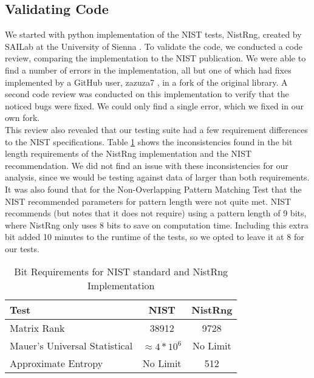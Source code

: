 \documentclass[11pt,letterpaper,conference]{IEEEtran}
\begin{document}
\subsection{Validating Code}
We started with python implementation of the NIST tests, NistRng, created by SAILab at the University of Sienna \cite{SAILab}. To validate the code, we conducted a code review, comparing the implementation to the NIST publication. We were able to find a number of errors in the implementation, all but one of which had fixes implemented by a GitHub user, zazuza7 \cite{zazuza7}, in a fork of the original library. A second code review was conducted on this implementation to verify that the noticed bugs were fixed. We could only find a single error, which we fixed in our own fork.\\

This review also revealed that our testing suite had a few requirement differences to the NIST specifications. Table \ref{table:Bits} shows the inconsistencies found in the bit length requirements of the NistRng implementation and the NIST recommendation. We did not find an issue with these inconsistencies for our analysis, since we would be testing against data of larger than both requirements. It was also found that for the Non-Overlapping Pattern Matching Test that the NIST recommended parameters for pattern length were not quite met. NIST recommends (but notes that it does not require) using a pattern length of 9 bits, where NistRng only uses 8 bits to save on computation time. Including this extra bit added 10 minutes to the runtime of the tests, so we opted to leave it at 8 for our tests.

\begin{table}
\begin{tabular}{|l||c|c|}
\hline
Test & NIST & NistRng \\
\hline
Matrix Rank  & 38912 &  9728\\
Mauer's Universal Statistical & $\approx 4*10^6$ & No Limit\\
Approximate Entropy & No Limit & 512\\
\hline
\end{tabular}\\
\caption{Bit Requirements for NIST standard and NistRng Implementation}
\label{table:Bits}
\end{table}
\end{document}
